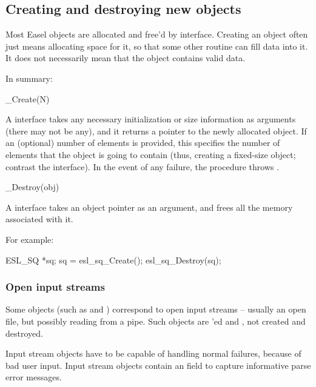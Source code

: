 \subsection{Creating and destroying new objects}

Most Easel objects are allocated and free'd by
 interface. Creating an object often
just means allocating space for it, so that some other routine can
fill data into it. It does not necessarily mean that the object
contains valid data.

In summary:

\begin{sreapi}
\hypertarget{ifc:Create} 
{\item[\_Create(N)]}

A  interface takes any necessary initialization or
size information as arguments (there may not be any), and it returns a
pointer to the newly allocated object. If an (optional) number of
elements  is provided, this specifies the number of elements
that the object is going to contain (thus, creating a fixed-size
object; contrast the  interface).  In the
event of any failure, the procedure throws .

\hypertarget{ifc:Destroy} 
{\item[\_Destroy(obj)]}
A  interface takes an object pointer as an
argument, and frees all the memory associated with it.
\end{sreapi}

For example:
\begin{cchunk}
   ESL_SQ *sq;
   sq = esl_sq_Create();
   esl_sq_Destroy(sq);
\end{cchunk}



\subsubsection{Open input streams}

Some objects (such as  and )
correspond to open input streams -- usually an open file, but possibly
reading from a pipe. Such objects are 'ed and
, not created and destroyed.

Input stream objects have to be capable of handling normal failures,
because of bad user input. Input stream objects contain an
 field to capture informative parse error
messages. 

